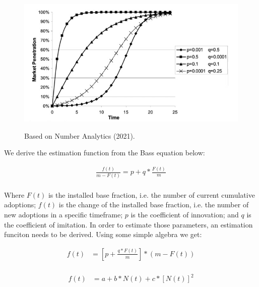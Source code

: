 \documentclass{article}
\begin{document}
\begin{figure}[hptb]
    \centering{}\includegraphics[scale=0.45]{plots/bass_model_example.png}\\
    \caption{Based on Number Analytics (2021).}
\end{figure}

\noindent We derive the estimation function from the Bass equation below:

\begin{equation} \label{eq1}
    \begin{split}
        \frac{f(t)}{m - F(t)} = p + q * \frac{F(t)}{m}\\
    \end{split}
\end{equation}

\noindent Where $F(t)$ is the installed base fraction, i.e. the number of current cumulative adoptions; $f(t)$ is the change of the installed base
fraction, i.e. the number of new adoptions in a specific timeframe; $p$ is the coefficient of innovation; and $q$ is the coefficient of imitation.
In order to estimate those parameters, an estimation funciton needs to be derived. Using some simple algebra we get:

\begin{equation} \label{eq2}
    \begin{split}
    f(t) & = \left[ p + \frac{q * F(t)}{m} \right] * (m - F(t)) \\
    \end{split}
\end{equation}

\begin{equation} \label{eq3}
    \begin{split}
    f(t) & = a + b * N(t) + c * \left[ N(t) \right]^2
    \end{split}
\end{equation}
\end{document}
